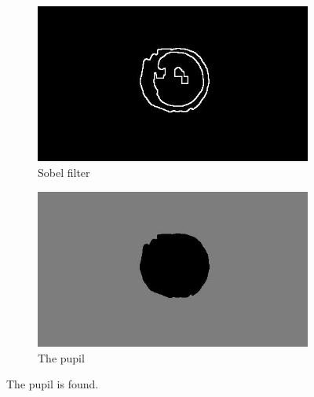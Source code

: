 \documentclass{article}
\begin{document}
%
%
\begin{figure}[H]
\centering

\begin{subfigure}{.5\textwidth}
  \centering
  \includegraphics[width=0.9\linewidth]{res/pupil/results/bin_to_sobel.jpg}
  \caption{Sobel filter}
  \label{fig:original_img}
\end{subfigure}%
\begin{subfigure}{.5\textwidth}
  \centering
  \includegraphics[width=0.9\linewidth]{res/pupil/results/sobel_to_part_result.jpg}
  \caption{The pupil}
  \label{fig:gray_img}
\end{subfigure}


\caption{The pupil is found.}
\label{fig:result_pup_sobel_to_part_result}
\end{figure}
\end{document}
